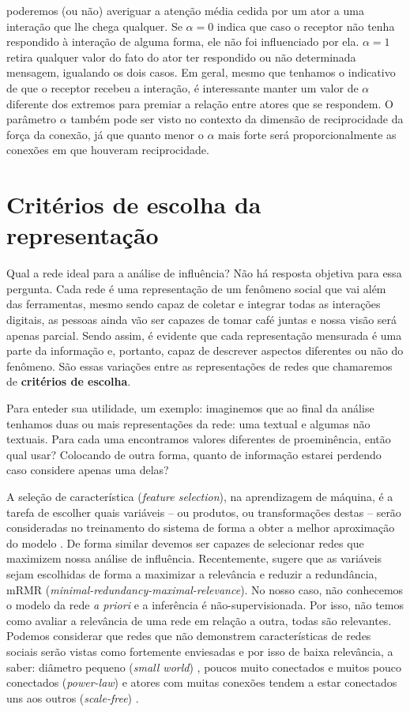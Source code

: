 \begin{itemize}
  poderemos (ou não) averiguar a atenção média cedida por um ator a uma
  interação que lhe chega qualquer. Se $\alpha=0$ indica que caso o receptor não
  tenha respondido à interação de alguma forma, ele não foi influenciado por
  ela. $\alpha=1$ retira qualquer valor do fato do ator ter respondido ou não
  determinada mensagem, igualando os dois casos. Em geral, mesmo que tenhamos o
  indicativo de que o receptor recebeu a interação, é interessante manter um
  valor de $\alpha$ diferente dos extremos para premiar a relação entre atores
  que se respondem. O parâmetro $\alpha$ também pode ser visto no contexto da
  dimensão de reciprocidade da força da conexão, já que quanto menor o $\alpha$
  mais forte será proporcionalmente as conexões em que houveram reciprocidade.
\end{itemize}

\section{Critérios de escolha da representação}
\label{sec:criterios}
Qual a rede ideal para a análise de influência? Não há resposta objetiva para
essa pergunta. Cada rede é uma representação de um fenômeno social que vai além
das ferramentas, mesmo sendo capaz de coletar e integrar todas as interações
digitais, as pessoas ainda vão ser capazes de tomar café juntas e nossa visão
será apenas parcial. Sendo assim, é evidente que cada representação mensurada é
uma parte da informação e, portanto, capaz de descrever aspectos diferentes ou
não do fenômeno. São essas variações entre as representações de redes que
chamaremos de \textbf{critérios de escolha}.

Para enteder sua utilidade, um exemplo: imaginemos que ao final da análise
tenhamos duas ou mais representações da rede: uma textual e algumas não textuais.
Para cada uma encontramos valores diferentes de proeminência, então qual usar?
Colocando de outra forma, quanto de informação estarei perdendo caso considere
apenas uma delas?

A seleção de característica (\emph{feature selection}), na aprendizagem de
máquina, é a tarefa de escolher quais variáveis -- ou produtos, ou transformações
destas -- serão consideradas no treinamento do sistema de forma a obter a melhor
aproximação do modelo \citep{Jain1997, Blum1997, Jain2000}. De forma similar
devemos ser capazes de selecionar redes que maximizem nossa análise de
influência. Recentemente, \citet{Peng2005} sugere que as variáveis sejam
escolhidas de forma a maximizar a relevância e reduzir a redundância, mRMR
(\emph{minimal-redundancy-maximal-relevance}). No nosso caso, não conhecemos o
modelo da rede \emph{a priori} e a inferência é não-supervisionada. Por isso, não
temos como avaliar a relevância de uma rede em relação a outra, todas são
relevantes. Podemos considerar que redes que não demonstrem características de
redes sociais serão vistas como fortemente enviesadas e por isso de baixa
relevância, a saber: diâmetro pequeno (\emph{small world}) \citep{Milgram1967,
Watts1998}, poucos muito conectados e muitos pouco conectados (\emph{power-law})
\citep{Liljeros2001, Mitzenmacher2004} e atores com muitas conexões tendem a
estar conectados uns aos outros (\emph{scale-free}) \citep{Li2005}.

